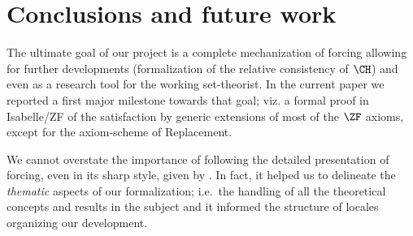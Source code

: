 \section{Conclusions and future work}
\label{sec:conclusions-future-work}



The ultimate goal of our project is a complete mechanization of
forcing allowing for further developments (formalization of the
relative consistency of $\CH$) and even as a research tool for the
working set-theorist.  In the current paper we reported a first major
milestone towards that goal; viz. a formal proof in Isabelle/ZF of the
satisfaction by generic extensions of most of the $\ZF$ axioms, except
for the axiom-scheme of Replacement.

We cannot overstate the importance of following the detailed
presentation of forcing, even in its sharp style, given by
\citet{kunen2011set}. In fact, it helped us to delineate the
\emph{thematic} aspects of our formalization; i.e.~the handling of all
the theoretical concepts and results in the subject and it informed
the structure of locales organizing our development.



